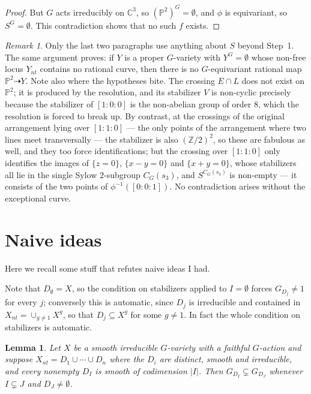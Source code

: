 \documentclass[11pt]{amsart}
\theoremstyle{plain}
\newtheorem{lemma}[theorem]{Lemma}
\theoremstyle{definition}
\theoremstyle{remark}
\newtheorem{remark}[theorem]{Remark}
\numberwithin{equation}{section}
\begin{document}
\begin{proof}
But $G$ acts irreducibly on $\mathbb{C}^3$, so $(\mathbb{P}^2)^G =
\emptyset$, and $\phi$ is equivariant, so $S^G = \emptyset$.  This
contradiction shows that no such $f$ exists.
\end{proof}

\begin{remark}
Only the last two paragraphs use anything about $S$ beyond Step~1.  The
same argument proves: if $Y$ is a proper $G$-variety with $Y^G = \emptyset$
whose non-free locus $Y_{nt}$ contains no rational curve, then there is no
$G$-equivariant rational map $\mathbb{P}^2 \dasharrow Y$.  Note also where
the hypotheses bite.  The crossing $E \cap L$ does not exist on
$\mathbb{P}^2$; it is produced by the resolution, and its stabilizer $V$ is
non-cyclic precisely because the stabilizer of $[1:0:0]$ is the non-abelian
group of order $8$, which the resolution is forced to break up.  By
contrast, at the crossings of the original arrangement lying over
$[1:1:0]$ --- the only points of the arrangement where two lines meet
transversally --- the stabilizer is also $(\mathbb{Z}/2)^2$, so these are
fabulous as well, and they too force identifications; but the crossing over
$[1:1:0]$ only identifies the images of $\{z=0\}$, $\{x-y=0\}$ and
$\{x+y=0\}$, whose stabilizers all lie in the single Sylow $2$-subgroup
$C_G(s_3)$, and $S^{C_G(s_3)}$ is non-empty --- it consists of the two
points of $\phi^{-1}([0:0:1])$.  No contradiction arises without the
exceptional curve.
\end{remark}

\section{Naive ideas}

Here we recall some stuff that refutes naive ideas I had.

Note that $D_\emptyset = X$, so the condition on stabilizers applied to
$I = \emptyset$ forces $G_{D_j} \neq 1$ for every $j$; conversely this is
automatic, since $D_j$ is irreducible and contained in
$X_{nt} = \cup_{g \neq 1} X^g$, so that $D_j \subseteq X^g$ for some
$g \neq 1$.  In fact the whole condition on stabilizers is automatic.

\begin{lemma} \label{lem:strict}
Let $X$ be a smooth irreducible $G$-variety with a faithful $G$-action and
suppose $X_{nt} = D_1 \cup \cdots \cup D_n$ where the $D_i$ are distinct,
smooth and irreducible, and every nonempty $D_I$ is smooth of codimension
$|I|$.  Then $G_{D_I} \subsetneq G_{D_J}$ whenever
$I \subsetneq J$ and $D_J \neq \emptyset$.
\end{lemma}
\end{document}
